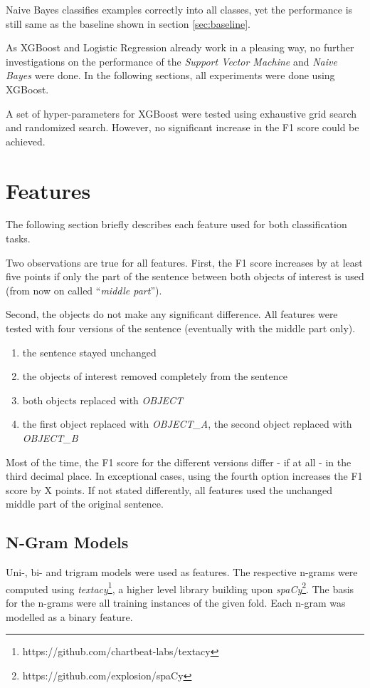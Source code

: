 Naive Bayes classifies examples correctly into all classes, yet the performance is still same as the baseline shown in section \ref{sec:baseline}.

As XGBoost and Logistic Regression already work in a pleasing way, no further investigations on the performance of the \emph{Support Vector Machine} and \emph{Naive Bayes} were done. In the following sections, all experiments were done using XGBoost.

A set of hyper-parameters for XGBoost were tested using exhaustive grid search and randomized search. However, no significant increase in the F1 score could be achieved.








\section{Features}
The following section briefly describes each feature used for both classification tasks. 

Two observations are true for all features. First, the F1 score increases by at least five points if only the part of the sentence between both objects of interest is used (from now on called \enquote{\emph{middle part}}).

 Second, the objects do not make any significant difference. All features were tested with four versions of the sentence (eventually with the middle part only). 
\begin{enumerate}
\item the sentence stayed unchanged
\item the objects of interest removed completely from the sentence
\item both objects replaced with \emph{OBJECT}
\item the first object replaced with \emph{OBJECT\_A}, the second object replaced with \emph{OBJECT\_B}
\end{enumerate}
Most of the time, the F1 score for the different versions differ - if at all - in the third decimal place. In exceptional cases, using the fourth option increases the F1 score by X points. If not stated differently, all features used the unchanged middle part of the original sentence.


\subsection{N-Gram Models}
Uni-, bi- and trigram models were used as features. The respective n-grams were computed using \emph{textacy}\footnote{https://github.com/chartbeat-labs/textacy}, a higher level library building upon \emph{spaCy}\footnote{https://github.com/explosion/spaCy}.  The basis for the n-grams were all training instances of the given fold. Each n-gram was modelled as a binary feature. 

